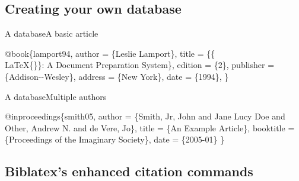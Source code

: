 \subsection{Creating your own database}\label{subsec:database}

\begin{frame}[fragile]{A \BibTeX{} database}{A basic article}

\begin{example}
  \begin{semiverbatim}
  \alert<2>{@book}\alert<3>{\{}\alert<4>{lamport94}\alert<5>{,}
    \alert<6>{author}    \alert<7>{= \{}\alert<8>{Leslie Lamport}\alert<7>{\},}
    \alert<6>{title}     \alert<7>{=
    \{}\alert<8-9>{\{\\LaTeX\{\}\}}\alert<8>{: A Document Preparation System}\alert<7>{\},}
    \alert<6>{edition}   \alert<7>{= \{}\alert<8>{2}\alert<7>{\},}
    \alert<6>{publisher} \alert<7>{= \{}\alert<8>{Addison-{}-Wesley}\alert<7>{\},}
    \alert<6>{address}   \alert<7>{= \{}\alert<8>{New York}\alert<7>{\},}
    \alert<6>{date}      \alert<7>{= \{}\alert<8,10>{{1994}}\alert<7>{\},}
  \alert<3>{\}}
  \end{semiverbatim}
\end{example}

\end{frame}

\begin{frame}[fragile]{A \BibTeX{} database}{Multiple authors}

\begin{example}
  \begin{semiverbatim}
  @inproceedings\{smith05,
    author    = \{\alert<4-5>{Smith, Jr, John} \alert<2>{and} \alert<3>{Jane Lucy Doe}
    \alert<2>{and} \alert<4>{Other, Andrew N.} \alert<2>{and} \alert<4>{de Vere, Jo}\},
    title     = \{An Example Article\},
    booktitle = \{Proceedings of the Imaginary Society\},
    date      = \{\alert<6>{2005-01}\}
  \}
  \end{semiverbatim}
\end{example}

\end{frame}

\subsection{Biblatex's enhanced citation commands}\label{subsec:cite-biblatex}


